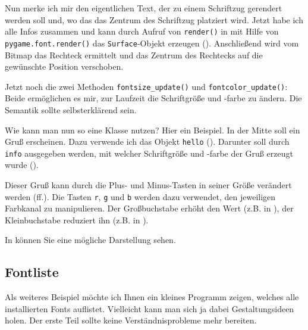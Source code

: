 Nun merke ich mir den eigentlichen Text, der zu einem Schriftzug gerendert werden soll und, wo das das Zentrum des Schriftzug platziert wird. Jetzt habe ich alle Infos zusammen und kann durch Aufruf von \texttt{render()} in  mit Hilfe von \texttt{pygame\-.font\-.ren\-der()} das \texttt{Surface}-Objekt erzeugen (). Anschließend wird vom Bitmap das Rechteck ermittelt und das Zentrum des Rechtecks auf die gewünschte Position verschoben.

Jetzt noch die zwei Methoden \texttt{fontsize\_update()} und \texttt{fontcolor\_update()}: Beide ermöglichen es mir, zur Laufzeit die Schriftgröße und -farbe zu ändern. Die Semantik sollte selbsterklärend sein.

Wie kann man nun so eine Klasse nutzen? Hier ein Beispiel. In der Mitte soll ein Gruß erscheinen. Dazu verwende ich das Objekt \texttt{hello} (). Darunter soll durch \texttt{info} ausgegeben werden, mit welcher Schriftgröße und -farbe der Gruß erzeugt wurde (). 

\newpage
{} 

Dieser Gruß kann durch die Plus- und Minus-Tasten in seiner Größe verändert werden (ff.). Die Tasten \texttt{r}, \texttt{g} und \texttt{b} werden dazu verwendet, den jeweiligen Farbkanal zu manipulieren. Der Großbuchstabe erhöht den Wert (z.B. in ), der Kleinbuchstabe reduziert ihn (z.B. in ).

In  können Sie eine mögliche Darstellung sehen.

\subsection{Fontliste}

Als weiteres Beispiel möchte ich Ihnen ein kleines Programm zeigen, welches alle installierten Fonts auflistet. Vielleicht kann man sich ja dabei Gestaltungsideen holen. Der erste Teil sollte keine Verständnisprobleme mehr bereiten.



